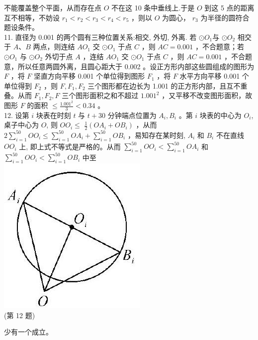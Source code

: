 \documentclass[10pt]{article}
\begin{document}
不能覆盖整个平面，从而存在点 $O$ 不在这 10 条中垂线上.于是 $O$ 到这 5 点的距离互不相等，不妨设 $r_{1}<r_{2}<r_{3}<r_{4}<r_{5}$ ，则以 $O$ 为圆心， $r_{3}$ 为半径的圆符合题设条件。\\
11. 直径为 0.001 的两个圆有三种位置关系:相交, 外切, 外离. 若 $\odot O_{1}$与 $\odot O_{2}$ 相交于 $A 、 B$ 两点，则连结 $A O_{1}$ 交 $\odot O_{1}$ 于点 $C$ ，则 $A C=0.001$ ，不合题意；若 $\odot O_{1}$ 与 $\odot O_{2}$ 外切于点 $A$ ，连结 $A O_{1}$ 交 $\odot O_{1}$ 于点 $C$ ，则 $A C=0.001$ ，不合题意，所以任意两圆外离，且圆心距大于 0.002 。设正方形内部这些圆组成的图形为 $F$ ，将 $F$ 坚直方向平移 0.001 个单位得到图形 $F_{1}$ ，将 $F$ 水平方向平移 0.001 个单位得到 $F_{2}$ ，则 $F, F_{1}, F_{2}$ 三个图形都在边长为 1.001 的正方形内部，且互不重叠。从而 $F_{1}, F_{2}, F$ 三个图形面积之和不超过 $1.001^{2}$ ，又平移不改变图形面积，故图形 $F$ 的面积 $\leqslant \frac{1.001^{2}}{3}<0.34$ 。\\
12. 设第 $i$ 块表在时刻 $t$ 与 $t+30$ 分钟端点位置为 $A_{i}, B_{i}$ 。第 $i$ 块表的中心为 $O_{i}$, 桌子中心为 $O$, 则 $O O_{i} \leqslant$ $\frac{1}{2}\left(O A_{i}+O B_{i}\right)$ ，从而 $2 \sum_{i=1}^{50} O O_{i} \leqslant \sum_{i=1}^{50} O A_{i}+\sum_{i=1}^{50} O B_{i}$ ，易知存在某时刻, $A_{i}$ 和 $B_{i}$ 不在直线 $O O_{i}$ 上, 即上式不等式是严格的。从而 $\sum_{i=1}^{50} O O_{i}<\sum_{i=1}^{50} O A_{i}$ 和 $\sum_{i=1}^{50} O O_{i}<\sum_{i=1}^{50} O B_{i}$ 中至\\
\includegraphics[max width=\textwidth, center]{2024_10_30_66b8e5e701da2093c133g-109(2)}\\
(第 12 题)

少有一个成立。
\end{document}
